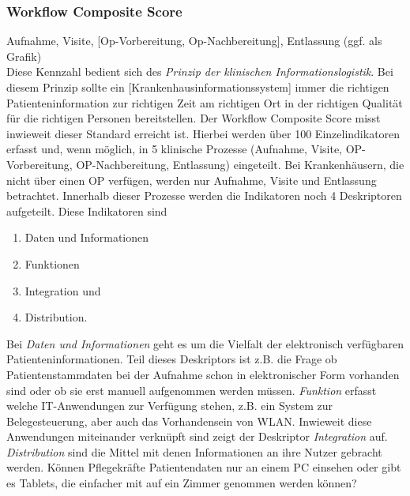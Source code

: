 	\subsubsection{Workflow Composite Score}
		Aufnahme, Visite, [Op-Vorbereitung, Op-Nachbereitung], Entlassung (ggf. als Grafik)\\
		Diese Kennzahl bedient sich des \textit{Prinzip der klinischen Informationslogistik}. Bei diesem Prinzip \glqq{}sollte ein [Krankenhausinformationssystem] immer die richtigen Patienteninformation zur richtigen Zeit am richtigen Ort in der richtigen Qualität für die richtigen Personen bereitstellen.\grqq\parencite[36]{huebner2019} Der Workflow Composite Score misst inwieweit dieser Standard erreicht ist. Hierbei werden über 100 Einzelindikatoren erfasst und, wenn möglich, in 5 klinische Prozesse (Aufnahme, Visite, OP-Vorbereitung, OP-Nachbereitung, Entlassung) eingeteilt. Bei Krankenhäusern, die nicht über einen OP verfügen, werden nur Aufnahme, Visite und Entlassung betrachtet. Innerhalb dieser Prozesse werden die Indikatoren noch 4 Deskriptoren aufgeteilt. Diese Indikatoren sind
		\begin{enumerate}
			\item Daten und Informationen
			\item Funktionen
			\item Integration und
			\item Distribution.
		\end{enumerate}
		Bei \textit{Daten und Informationen} geht es um die Vielfalt der elektronisch verfügbaren Patienteninformationen. Teil dieses Deskriptors ist z.B. die Frage ob Patientenstammdaten bei der Aufnahme schon in elektronischer Form vorhanden sind oder ob sie erst manuell aufgenommen werden müssen. \textit{Funktion} erfasst welche IT-Anwendungen zur Verfügung stehen, z.B. ein System zur Belegesteuerung, aber auch das Vorhandensein von WLAN. Inwieweit diese Anwendungen miteinander verknüpft sind zeigt der Deskriptor \textit{Integration} auf. \textit{Distribution} sind die Mittel mit denen Informationen an ihre Nutzer gebracht werden. Können Pflegekräfte Patientendaten nur an einem PC einsehen oder gibt es Tablets, die einfacher mit auf ein Zimmer genommen werden können?

